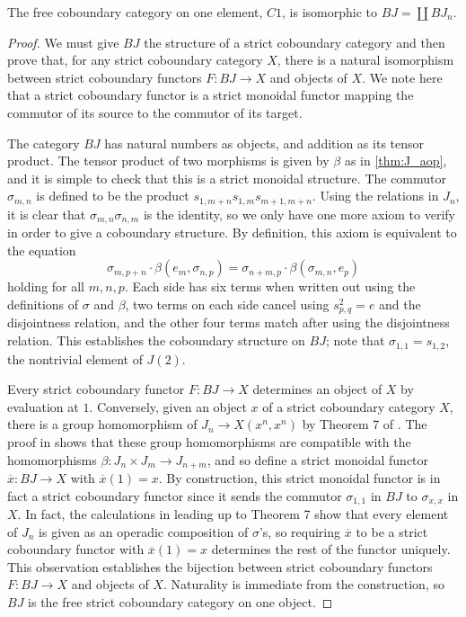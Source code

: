 \begin{thm}
The free coboundary category on one element, $C1$, is isomorphic to $BJ = \coprod BJ_{n}$.
\end{thm}
\begin{proof}
We must give $BJ$ the structure of a strict coboundary category and then prove that, for any strict coboundary category $X$, there is a natural isomorphism between strict coboundary functors $F \colon BJ \to X$ and objects of $X$. We note here that a strict coboundary functor is a strict monoidal functor mapping the commutor of its source to the commutor of its target.


The category $BJ$ has natural numbers as objects, and addition as its tensor product. The tensor product of two morphisms is given by $\beta$ as in \cref{thm:J_aop}, and it is simple to check that this is a strict monoidal structure. The commutor $\sigma_{m,n}$ is defined to be the product $s_{1, m+n}s_{1,m}s_{m+1,m+n}$. Using the relations in $J_{n}$, it is clear that $\sigma_{m,n}\sigma_{n,m}$ is the identity, so we only have one more axiom to verify in order to give a coboundary structure. By definition, this axiom is equivalent to the equation
  \[
    \sigma_{m, p+n}\cdot \beta(e_{m}, \sigma_{n,p}) = \sigma_{n+m,p}\cdot \beta(\sigma_{m,n},e_{p})
  \]
holding for all $m,n,p$. Each side has six terms when written out using the definitions of $\sigma$ and $\beta$, two terms on each side cancel using $s_{p,q}^{2} = e$ and the disjointness relation, and the other four terms match after using the disjointness relation. This establishes the coboundary structure on $BJ$; note that $\sigma_{1,1} = s_{1,2}$, the nontrivial element of $J(2)$.

Every strict coboundary functor $F \colon BJ \rightarrow X$ determines an object of $X$ by evaluation at $1$. Conversely, given an object $x$ of a strict coboundary category $X$, there is a group homomorphism of $J_{n} \to X(x^{n},x^{n})$ by Theorem 7 of \cite{hk-cobound}. The proof in \cite{hk-cobound} shows that these group homomorphisms are compatible with the homomorphisms $\beta \colon J_n \times J_m \to J_{n+m}$, and so define a strict monoidal functor $\overline{x} \colon BJ \rightarrow X$ with $\overline{x}(1) = x$. By construction, this strict monoidal functor is in fact a strict coboundary functor since it sends the commutor $\sigma_{1,1}$ in $BJ$ to $\sigma_{x,x}$ in $X$. In fact, the calculations in \cite{hk-cobound} leading up to Theorem 7 show that every element of $J_{n}$ is given as an operadic composition of $\sigma$'s, so requiring $\overline{x}$ to be a strict coboundary functor with $\overline{x}(1) = x$ determines the rest of the functor uniquely. This observation establishes the bijection between strict coboundary functors $F \colon BJ \rightarrow X$ and objects of $X$. Naturality is immediate from the construction, so $BJ$ is the free strict coboundary category on one object.
\end{proof}

